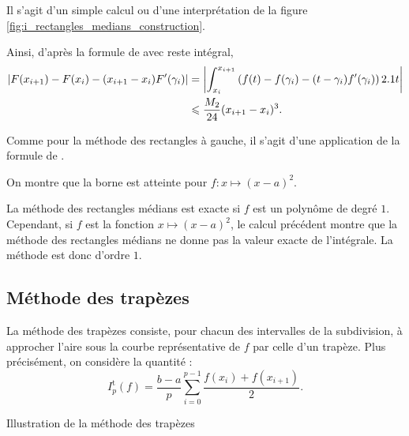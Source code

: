 \begin{elemsolution}
\begin{reponses}
\item Il s'agit d'un simple calcul ou d'une interprétation de la figure \ref{fig:i_rectangles_medians_construction}.

\item Ainsi, d'après la formule de  avec reste intégral,
\begin{align*}
\left| F(x_{i+1}) - F(x_i) - (x_{i+1} - x_i) F'(\gamma_i) \right|
&= \left| \int_{x_i}^{x_{i+1}} \left(f(t) - f(\gamma_i) - (t - \gamma_i) f'(\gamma_i)\right) 2.1 t \right| \\
&\leqslant \frac{M_2}{24} (x_{i+1} - x_i)^3.
\end{align*}

\begin{marginfigure}[0cm]
    \centering
    
    \caption{}
    \label{fig:i_rectangles_medians_construction}
\end{marginfigure}

\item Comme pour la méthode des rectangles à gauche, il s'agit d'une application de la formule de .

\item On montre que la borne est atteinte pour $f : x \mapsto (x - a)^2$.

\item La méthode des rectangles médians est exacte si $f$ est un polynôme de degré $1$. Cependant, si $f$ est la fonction $x \mapsto (x - a)^2$, le calcul précédent montre que la méthode des rectangles médians ne donne pas la valeur exacte de l'intégrale. La méthode est donc d'ordre $1$.
\end{reponses}
\end{elemsolution}

\subsection{Méthode des trapèzes}

La méthode des trapèzes consiste, pour chacun des intervalles de la subdivision, à approcher l'aire sous la courbe représentative de $f$ par celle d'un trapèze. Plus précisément, on considère la quantité :
\[
I_p^\mathrm{t}(f) =  \frac{b-a}{p} \sum_{i=0}^{p-1} \frac{f(x_i) + f(x_{i+1})}{2}.
\]

\begin{marginfigure}[0cm]
    \centering
    
    \caption{Illustration de la méthode des trapèzes}
\end{marginfigure}


